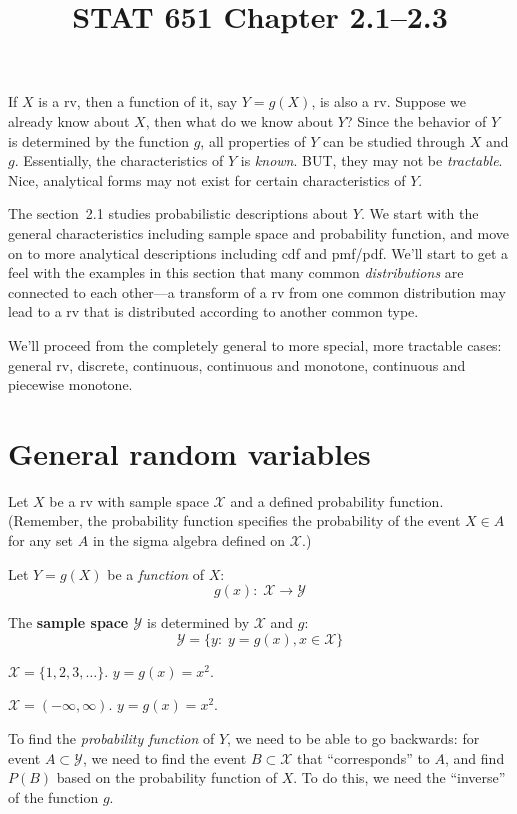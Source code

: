 \documentclass[12pt]{article}
\begin{document}
\title{STAT 651 Chapter 2.1--2.3}
\maketitle

If $X$ is a rv, then a function of it, say $Y = g(X)$,
is also a rv. Suppose we already know about $X$,
then what do we know about $Y$?
Since the behavior of $Y$ is determined by the function $g$,
all properties of $Y$ can be studied through $X$ and $g$.
Essentially, the characteristics of $Y$ is \emph{known}.
BUT, they may not be \emph{tractable}. Nice, analytical forms may not exist for
certain characteristics of $Y$.

The section~2.1 studies probabilistic descriptions about $Y$.
We start with the general characteristics including sample space and
probability function, and move on to more analytical descriptions
including cdf and pmf/pdf. We'll start to get a feel with the examples
in this section that many common \emph{distributions} are connected to each
other---a transform of a rv from one common distribution may lead to a
rv that is distributed according to another common type.

We'll proceed from the completely general to more special, more
tractable cases: general rv, discrete, continuous, continuous and
monotone, continuous and piecewise monotone.

\section{General random variables}

Let $X$ be a rv with sample space $\mathcal{X}$
and a defined probability function.
(Remember, the probability function specifies the probability
of the event $X \in A$ for any set $A$ in the sigma algebra defined on
$\mathcal{X}$.)

Let $Y = g(X)$ be a \emph{function} of $X$:
\[
g(x)\!:\; \mathcal{X} \to \mathcal{Y}
\]

The \textbf{sample space $\mathcal{Y}$} is determined
by $\mathcal{X}$ and $g$:
\[
\mathcal{Y} = \{y:\; y = g(x), x \in \mathcal{X}\}
\]

\example
$\mathcal{X} = \{1,2,3,\dotsc\}$.
$y = g(x) = x^2$.

\example
$\mathcal{X} = (-\infty, \infty)$.
$y = g(x) = x^2$.

To find the \emph{probability function} of $Y$,
we need to be able to go backwards:
for event $A\subset \mathcal{Y}$,
we need to find the event $B \subset \mathcal{X}$
that ``corresponds'' to $A$, and find
$P(B)$ based on the probability function of $X$.
To do this,
we need the ``inverse'' of the function $g$.
\end{document}
